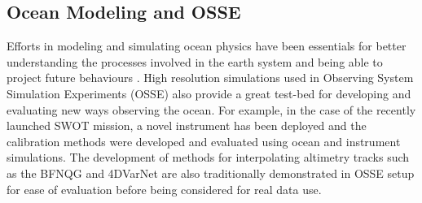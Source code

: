 \documentclass[draft]{agujournal2019}
\begin{document}


\subsection{Ocean Modeling and OSSE}
\label{ssec:oceanmodeling}
Efforts in modeling and simulating ocean physics have been essentials for better understanding the processes involved in the earth system and being able to project future behaviours \cite{bernardImpactPartialSteps2006,ajayiSpatialTemporalVariability2020}. 
High resolution simulations used in Observing System Simulation Experiments (OSSE) also provide a great test-bed for developing and evaluating new ways observing the ocean. For example, in the case of the recently launched SWOT mission, a novel instrument has been deployed and the calibration methods were developed and evaluated using ocean and instrument simulations\cite{}. 
The development of methods for interpolating altimetry tracks such as the BFNQG and 4DVarNet are also traditionally demonstrated in OSSE setup for ease of evaluation before being considered for real data use. 

\end{document}
